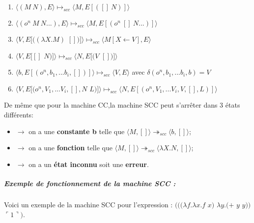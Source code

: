 \documentclass[10pt,a4paper]{report}
\begin{document}
\begin{enumerate}
\item $\langle(M~N),E\rangle \longmapsto_{scc} \langle M,E[([]~N)]\rangle$
  
\item $\langle(o^{n}~M~N...),E\rangle \longmapsto_{scc} \langle M,E[(o^{n}~[]~N...)]\rangle$
  
\item $\langle V,E[((\lambda X.M)$ $[])]\rangle \longmapsto_{scc} \langle M[X\leftarrow V],E\rangle$
  
\item $\langle V,E[[]$ $N)]\rangle \longmapsto_{scc} \langle N,E[(V$ $[])]\rangle$
  
\item $\langle b,E[(o^{n},b_{1},...b_{i},[])]\rangle \longmapsto_{scc} \langle V,E\rangle$ avec $\delta
  (o^{n},b_{1},...b_{i},b)=V$ 
  
\item $\langle V,E[(o^{n},V_{1},...V_{i},[],N$ $L)]\rangle \longmapsto_{scc} \langle N,E[(o^{n},V_{1},...V_{i},V,[],L)]\rangle$
\end{enumerate}
\bigbreak


De même que pour la machine CC,la machine SCC peut s'arrêter dans 3 états différents:
\begin{itemize}
\item[]$\longrightarrow$ on a une \textbf{constante b} telle que $\langle M,[]\rangle \twoheadrightarrow_{scc} \langle b,[]\rangle$;
\item[]$\longrightarrow$ on a une \textbf{fonction} telle que $\langle M,[]\rangle \twoheadrightarrow_{scc} \langle\lambda X.N,[]\rangle$;
\item[]$\longrightarrow$ on a un \textbf{état inconnu} soit une \textbf{erreur}.
\end{itemize}
\bigbreak


\subparagraph{Exemple de fonctionnement de la machine SCC :}
Voici un exemple de la machine SCC pour l'expression : 
\smallbreak 
$(((\lambda f.\lambda x.f$ $x)$ $\lambda y.(+$ $y$ $y))$ $\ulcorner 1\urcorner)$.
\end{document}
